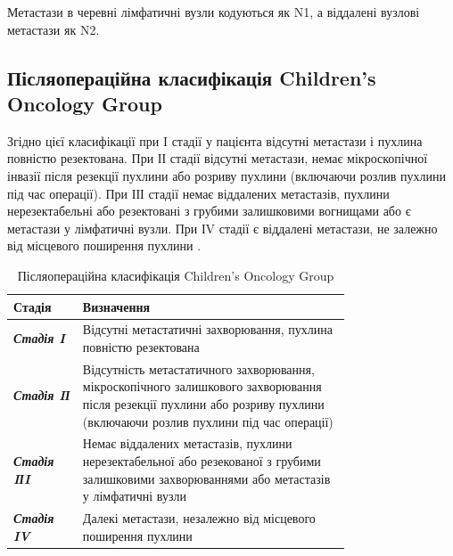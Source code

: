 Метастази в черевні лімфатичні вузли кодуються як N1, а віддалені вузлові метастази як N2.
\subsection{Післяопераційна класифікація Children’s Oncology Group }

Згідно цієї класифікації при I стадії у пацієнта відсутні метастази і пухлина повністю резектована. При ІІ стадії відсутні метастази, немає мікроскопічної інвазії після резекції пухлини або розриву пухлини (включаючи розлив пухлини під час операції). При ІІІ стадії немає віддалених метастазів, пухлини нерезектабельні або резектовані з грубими залишковими вогнищами або є метастази у лімфатичні вузли. При ІV стадії є віддалені метастази, не залежно від місцевого поширення пухлини \cite{pmid24852330}.


\begin{table}[]
\small
\caption{Післяопераційна класифікація Children’s Oncology Group\cite{pmid24852330}}
\label{table:subPRETEXT}

\centering

\normalsize
\begin{tabular}{|p{0.15\linewidth} | p{0.6\linewidth}|}
\hline
\textbf{Стадія}                                    & \textbf{Визначення}                                                                     \\ \hline
{\color[HTML]{202124} \textit{\textbf{Стадія I}}}  & {\color[HTML]{202124} Відсутні метастатичні захворювання, пухлина повністю резектована} \\ \hline
{\color[HTML]{202124} \textit{\textbf{Стадія IІ}}} &
  {\color[HTML]{202124} Відсутність метастатичного захворювання, 
  мікроскопічного залишкового захворювання після резекції пухлини або розриву пухлини 
  (включаючи розлив пухлини під час операції)} \\ \hline
{\color[HTML]{202124} \textit{\textbf{Стадія IІI}}} &
  {\color[HTML]{202124} Немає віддалених метастазів, 
  пухлини нерезектабельної або 
  резекованої з грубими залишковими захворюваннями 
  або метастазів у лімфатичні вузли} \\ \hline
{\color[HTML]{202124} \textit{\textbf{Стадія IV}}} & {\color[HTML]{202124} Далекі метастази, незалежно від місцевого поширення пухлини}      \\ \hline
\end{tabular}%

\end{table}


